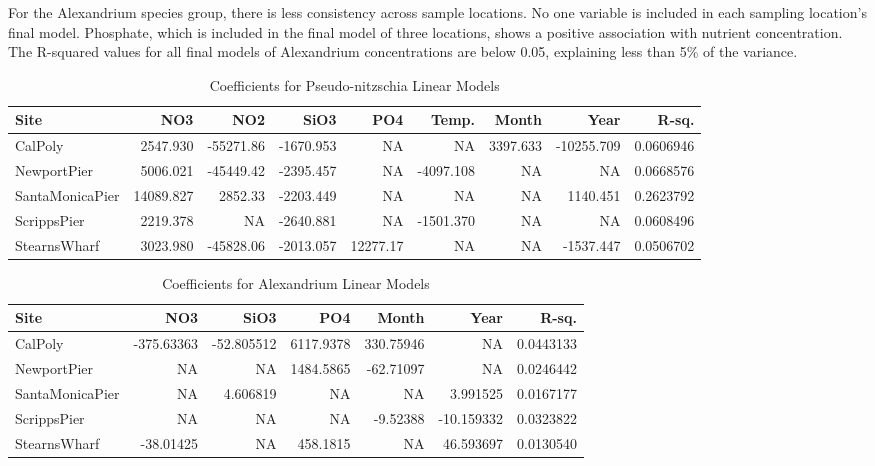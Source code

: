 \documentclass[
  12pt,
]{article}
\begin{document}
For the Alexandrium species group, there is less consistency across
sample locations. No one variable is included in each sampling
location's final model. Phosphate, which is included in the final model
of three locations, shows a positive association with nutrient
concentration. The R-squared values for all final models of Alexandrium
concentrations are below 0.05, explaining less than 5\% of the variance.

\begingroup\fontsize{9}{11}\selectfont

\begin{longtable}[t]{lrrrrrrrr}
\caption{\label{tab:LM Output Tables}Coefficients for Pseudo-nitzschia Linear Models}\\
\toprule
Site & NO3 & NO2 & SiO3 & PO4 & Temp. & Month & Year & R-sq.\\
\midrule
CalPoly & 2547.930 & -55271.86 & -1670.953 & NA & NA & 3397.633 & -10255.709 & 0.0606946\\
NewportPier & 5006.021 & -45449.42 & -2395.457 & NA & -4097.108 & NA & NA & 0.0668576\\
SantaMonicaPier & 14089.827 & 2852.33 & -2203.449 & NA & NA & NA & 1140.451 & 0.2623792\\
ScrippsPier & 2219.378 & NA & -2640.881 & NA & -1501.370 & NA & NA & 0.0608496\\
StearnsWharf & 3023.980 & -45828.06 & -2013.057 & 12277.17 & NA & NA & -1537.447 & 0.0506702\\
\bottomrule
\end{longtable}
\endgroup{}

\begingroup\fontsize{9}{11}\selectfont

\begin{longtable}[t]{lrrrrrr}
\caption{\label{tab:LM Output Tables}Coefficients for Alexandrium Linear Models}\\
\toprule
Site & NO3 & SiO3 & PO4 & Month & Year & R-sq.\\
\midrule
CalPoly & -375.63363 & -52.805512 & 6117.9378 & 330.75946 & NA & 0.0443133\\
NewportPier & NA & NA & 1484.5865 & -62.71097 & NA & 0.0246442\\
SantaMonicaPier & NA & 4.606819 & NA & NA & 3.991525 & 0.0167177\\
ScrippsPier & NA & NA & NA & -9.52388 & -10.159332 & 0.0323822\\
StearnsWharf & -38.01425 & NA & 458.1815 & NA & 46.593697 & 0.0130540\\
\bottomrule
\end{longtable}
\endgroup{}
\end{document}
